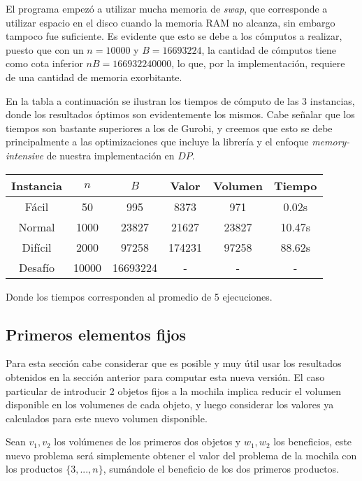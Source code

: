 \documentclass[letterpaper,10pt]{article}
\begin{document}
  El programa empezó a utilizar mucha memoria de \textit{swap}, que corresponde a utilizar espacio en el disco cuando la memoria RAM no alcanza, sin embargo tampoco fue suficiente. Es evidente que esto se debe a los cómputos a realizar, puesto que con un $n=10000$ y $B=16693224$, la cantidad de cómputos tiene como cota inferior $nB = 166932240000$, lo que, por la implementación, requiere de una cantidad de memoria exorbitante.
  
  En la tabla a continuación se ilustran los tiempos de cómputo de las 3 instancias, donde los resultados óptimos son evidentemente los mismos. Cabe señalar que los tiempos son bastante superiores a los de Gurobi, y creemos que esto se debe principalmente a las optimizaciones que incluye la librería y el enfoque \textit{memory-intensive} de nuestra implementación en $DP$.
  
  \begin{center}
    \begin{tabular}{c|c|c|c|c|c}
      Instancia & $n$ & $B$ & Valor & Volumen & Tiempo\\\hline
      Fácil & 50 & 995 & 8373 & 971 & 0.02s\\
      Normal & 1000 & 23827 & 21627 & 23827 & 10.47s\\
      Difícil & 2000 & 97258 & 174231 & 97258 & 88.62s\\
      Desafío & 10000 & 16693224 & - & - & -\\
    \end{tabular}
  \end{center}
  
  Donde los tiempos corresponden al promedio de 5 ejecuciones.
  
  \subsection{Primeros elementos fijos}
  
  Para esta sección cabe considerar que es posible y muy útil usar los resultados obtenidos en la sección anterior para computar esta nueva versión. El caso particular de introducir 2 objetos fijos a la mochila implica reducir el volumen disponible en los volumenes de cada objeto, y luego considerar los valores ya calculados para este nuevo volumen disponible.
  
  Sean $v_{1}, v_{2}$ los volúmenes de los primeros dos objetos y $w_{1}, w_{2}$ los beneficios, este nuevo problema será simplemente obtener el valor del problema de la mochila con los productos $\{3, ..., n\} $, sumándole el beneficio de los dos primeros productos.
 
\end{document}
